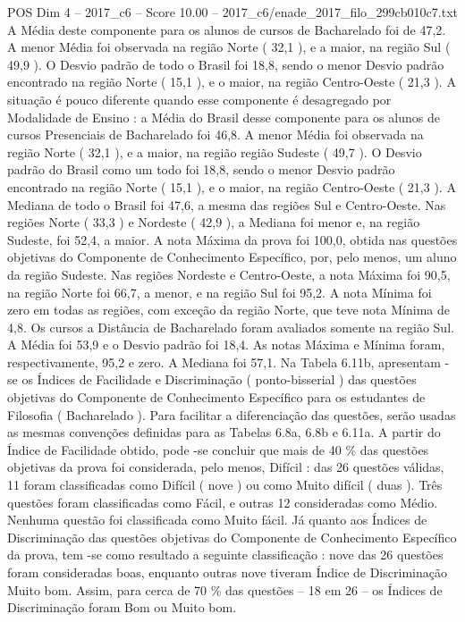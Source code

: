 \begin{textsample}{POS Dim 4 – 2017\_c6 – Score 10.00 – 2017\_c6/enade\_2017\_filo\_299cb010c7.txt}
A Média deste componente para os alunos de cursos de Bacharelado foi de 47,2.
A menor Média foi observada na região Norte ( 32,1 ), e a maior, na região Sul ( 49,9 ).
O Desvio padrão de todo o Brasil foi 18,8, sendo o menor Desvio padrão encontrado na região Norte ( 15,1 ), e o maior, na região Centro-Oeste ( 21,3 ).
A situação é pouco diferente quando esse componente é desagregado por Modalidade de Ensino : a Média do Brasil desse componente para os alunos de cursos Presenciais de Bacharelado foi 46,8.
A menor Média foi observada na região Norte ( 32,1 ), e a maior, na região região Sudeste ( 49,7 ).
O Desvio padrão do Brasil como um todo foi 18,8, sendo o menor Desvio padrão encontrado na região Norte ( 15,1 ), e o maior, na região Centro-Oeste ( 21,3 ).
A Mediana de todo o Brasil foi 47,6, a mesma das regiões Sul e Centro-Oeste.
Nas regiões Norte ( 33,3 ) e Nordeste ( 42,9 ), a Mediana foi menor e, na região Sudeste, foi 52,4, a maior.
A nota Máxima da prova foi 100,0, obtida nas questões objetivas do Componente de Conhecimento Específico, por, pelo menos, um aluno da região Sudeste.
Nas regiões Nordeste e Centro-Oeste, a nota Máxima foi 90,5, na região Norte foi 66,7, a menor, e na região Sul foi 95,2.
A nota Mínima foi zero em todas as regiões, com exceção da região Norte, que teve nota Mínima de 4,8.
Os cursos a Distância de Bacharelado foram avaliados somente na região Sul.
A Média foi 53,9 e o Desvio padrão foi 18,4.
As notas Máxima e Mínima foram, respectivamente, 95,2 e zero.
A Mediana foi 57,1.
Na Tabela 6.11b, apresentam -se os Índices de Facilidade e Discriminação ( ponto-bisserial ) das questões objetivas do Componente de Conhecimento Específico para os estudantes de Filosofia ( Bacharelado ).
Para facilitar a diferenciação das questões, serão usadas as mesmas convenções definidas para as Tabelas 6.8a, 6.8b e 6.11a.
A partir do Índice de Facilidade obtido, pode -se concluir que mais de 40 \% das questões objetivas da prova foi considerada, pelo menos, Difícil : das 26 questões válidas, 11 foram classificadas como Difícil ( nove ) ou como Muito difícil ( duas ).
Três questões foram classificadas como Fácil, e outras 12 consideradas como Médio.
Nenhuma questão foi classificada como Muito fácil.
Já quanto aos Índices de Discriminação das questões objetivas do Componente de Conhecimento Específico da prova, tem -se como resultado a seguinte classificação : nove das 26 questões foram consideradas boas, enquanto outras nove tiveram Índice de Discriminação Muito bom.
Assim, para cerca de 70 \% das questões – 18 em 26 – os Índices de Discriminação foram Bom ou Muito bom.

\end{textsample}
